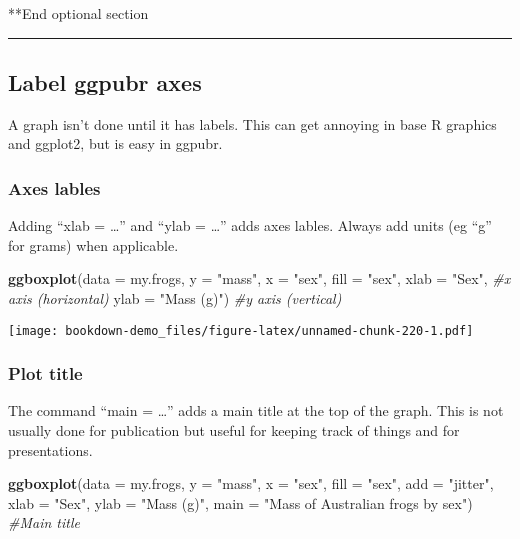 \documentclass[]{book}
\newenvironment{Shaded}{\begin{snugshade}}{\end{snugshade}}
\newcommand{\KeywordTok}[1]{\textcolor[rgb]{0.13,0.29,0.53}{\textbf{#1}}}
\newcommand{\DataTypeTok}[1]{\textcolor[rgb]{0.13,0.29,0.53}{#1}}
\newcommand{\StringTok}[1]{\textcolor[rgb]{0.31,0.60,0.02}{#1}}
\newcommand{\CommentTok}[1]{\textcolor[rgb]{0.56,0.35,0.01}{\textit{#1}}}
\newcommand{\NormalTok}[1]{#1}
\theoremstyle{definition}
\theoremstyle{definition}
\theoremstyle{definition}
\theoremstyle{remark}
\begin{document}
**End optional section

\begin{center}\rule{0.5\linewidth}{\linethickness}\end{center}

\subsection{Label ggpubr axes}\label{label-ggpubr-axes}

A graph isn't done until it has labels. This can get annoying in base R
graphics and ggplot2, but is easy in ggpubr.

\subsubsection{Axes lables}\label{axes-lables}

Adding ``xlab = \ldots{}'' and ``ylab = \ldots{}'' adds axes lables.
Always add units (eg ``g'' for grams) when applicable.

\begin{Shaded}
\begin{Highlighting}[]
\KeywordTok{ggboxplot}\NormalTok{(}\DataTypeTok{data =}\NormalTok{ my.frogs,}
          \DataTypeTok{y =} \StringTok{"mass"}\NormalTok{,}
          \DataTypeTok{x =} \StringTok{"sex"}\NormalTok{,}
          \DataTypeTok{fill =} \StringTok{"sex"}\NormalTok{,}
          \DataTypeTok{xlab =} \StringTok{"Sex"}\NormalTok{,      }\CommentTok{#x axis (horizontal)}
          \DataTypeTok{ylab =} \StringTok{"Mass (g)"}\NormalTok{) }\CommentTok{#y axis (vertical)}
\end{Highlighting}
\end{Shaded}

\texttt{[image: bookdown-demo\_files/figure-latex/unnamed-chunk-220-1.pdf]}

\subsubsection{Plot title}\label{plot-title}

The command ``main = \ldots{}'' adds a main title at the top of the
graph. This is not usually done for publication but useful for keeping
track of things and for presentations.

\begin{Shaded}
\begin{Highlighting}[]
\KeywordTok{ggboxplot}\NormalTok{(}\DataTypeTok{data =}\NormalTok{ my.frogs,}
          \DataTypeTok{y =} \StringTok{"mass"}\NormalTok{,}
          \DataTypeTok{x =} \StringTok{"sex"}\NormalTok{,}
          \DataTypeTok{fill =} \StringTok{"sex"}\NormalTok{,}
          \DataTypeTok{add =} \StringTok{"jitter"}\NormalTok{,}
          \DataTypeTok{xlab =} \StringTok{"Sex"}\NormalTok{,}
          \DataTypeTok{ylab =} \StringTok{"Mass (g)"}\NormalTok{,}
          \DataTypeTok{main =} \StringTok{"Mass of Australian frogs by sex"}\NormalTok{) }\CommentTok{#Main title}
\end{Highlighting}
\end{Shaded}
\end{document}
